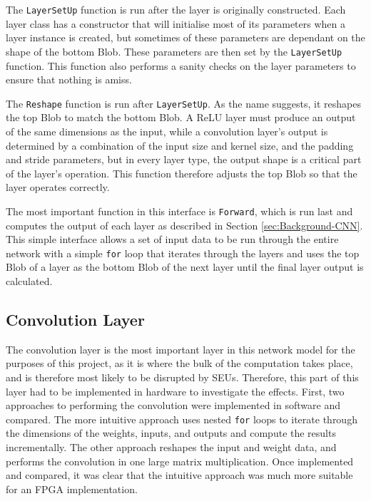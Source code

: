 \documentclass[12pt]{article}
\begin{document}
The \lstinline|LayerSetUp| function is run after the layer is originally constructed. Each layer class has a constructor that will initialise most of its parameters when a layer instance is created, but sometimes of these parameters are dependant on the shape of the bottom Blob. These parameters are then set by the \lstinline|LayerSetUp| function. This function also performs a sanity checks on the layer parameters to ensure that nothing is amiss.

The \lstinline|Reshape| function is run after \lstinline|LayerSetUp|. As the name suggests, it reshapes the top Blob to match the bottom Blob. A ReLU layer must produce an output of the same dimensions as the input, while a convolution layer's output is determined by a combination of the input size and kernel size, and the padding and stride parameters, but in every layer type, the output shape is a critical part of the layer's operation. This function therefore adjusts the top Blob so that the layer operates correctly.

The most important function in this interface is \lstinline|Forward|, which is run last and computes the output of each layer as described in Section \ref{sec:Background-CNN}. This simple interface allows a set of input data to be run through the entire network with a simple \lstinline|for| loop that iterates through the layers and uses the top Blob of a layer as the bottom Blob of the next layer until the final layer output is calculated.

\subsection{Convolution Layer}
\label{sec:Design-Conv}

The convolution layer is the most important layer in this network model for the purposes of this project, as it is where the bulk of the computation takes place, and is therefore most likely to be disrupted by SEUs. Therefore, this part of this layer had to be implemented in hardware to investigate the effects. First, two approaches to performing the convolution were implemented in software and compared. The more intuitive approach uses nested \lstinline|for| loops to iterate through the dimensions of the weights, inputs, and outputs and compute the results incrementally. The other approach reshapes the input and weight data, and performs the convolution in one large matrix multiplication. Once implemented and compared, it was clear that the intuitive approach was much more suitable for an FPGA implementation.
\end{document}
